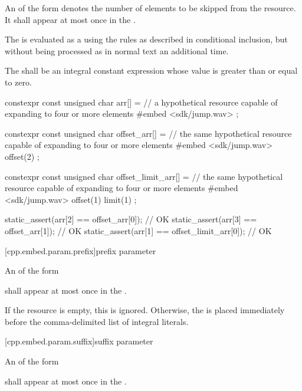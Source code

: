 \pnum
An  of the form
  \tcode{)}
denotes the number of elements to be skipped from the resource.
It shall appear at most once in the .

\pnum
The 
is evaluated as a 
using the rules as described in conditional inclusion,
but without being processed as in normal text an additional time.

\pnum
The 
shall be an integral constant expression
whose value is greater than or equal to zero.

\pnum
\begin{example}
\begin{codeblock}
constexpr const unsigned char arr[] = {
// a hypothetical resource capable of expanding to four or more elements
#embed <sdk/jump.wav>
};

constexpr const unsigned char offset_arr[] = {
// the same hypothetical resource capable of expanding to four or more elements
#embed <sdk/jump.wav> offset(2)
};

constexpr const unsigned char offset_limit_arr[] = {
// the same hypothetical resource capable of expanding to four or more elements
#embed <sdk/jump.wav> offset(1) limit(1)
};

static_assert(arr[2] == offset_arr[0]);         // OK
static_assert(arr[3] == offset_arr[1]);         // OK
static_assert(arr[1] == offset_limit_arr[0]);   // OK
\end{codeblock}
\end{example}

[cpp.embed.param.prefix]{prefix parameter}

\pnum
An  of the form
\begin{ncsimplebnf}
  \terminal{)}
\end{ncsimplebnf}
shall appear at most once in the .

\pnum
If the resource is empty, this  is ignored.
Otherwise, the  is placed immediately
before the comma-delimited list of integral literals.

[cpp.embed.param.suffix]{suffix parameter}

\pnum
An  of the form
\begin{ncsimplebnf}
  \terminal{)}
\end{ncsimplebnf}
shall appear at most once in the .

